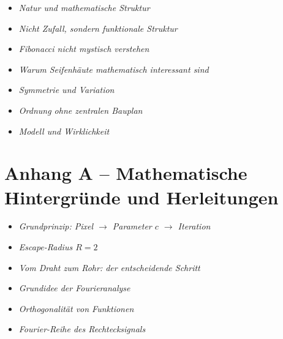 \begin{DidacticBox}[Didaktikboxen]
	\begin{itemize}
		\item \emph{Natur und mathematische Struktur}\dotfill \pageref{box:natur-struktur}
		\item \emph{Nicht Zufall, sondern funktionale Struktur}\dotfill \pageref{box:verzweigungsnetzwerk}
		\item \emph{Fibonacci nicht mystisch verstehen}\dotfill \pageref{box:fibonacci-mystisch}
		\item \emph{Warum Seifenhäute mathematisch \newline interessant sind}\dotfill \pageref{box:seifenhaut}
		\item \emph{Symmetrie und Variation}\dotfill \pageref{box:symmetrie-variation}
		\item \emph{Ordnung ohne zentralen Bauplan}\dotfill \pageref{box:selbstorganisation}
		\item \emph{Modell und Wirklichkeit}\dotfill \pageref{box:modell-wirklichkeit}
	\end{itemize}
\end{DidacticBox}





\section{Anhang A -- Mathematische Hintergründe und Herleitungen}

\begin{MathBox}[Matheboxen]
	\begin{itemize}
		\item \emph{Grundprinzip: Pixel \(\rightarrow\) Parameter \(c\) \(\rightarrow\) Iteration}\dotfill \pageref{box:mandelbrot-grundprinzip}
		\item \emph{Escape-Radius \(R=2\)}\dotfill \pageref{box:mandelbrot-escape-radius}
		\item \emph{Vom Draht zum Rohr: der entscheidende Schritt}\dotfill \pageref{box:draht-rohr}
		\item \emph{Grundidee der Fourieranalyse}\dotfill \pageref{box:anhangA-fourier-grundidee}
		\item \emph{Orthogonalität von Funktionen}\dotfill \pageref{box:anhangA-fourier-orthogonalitaet}
		\item \emph{Fourier-Reihe des Rechtecksignals}\dotfill \pageref{box:anhangA-fourier-rechteckreihe}
	\end{itemize}
\end{MathBox}

